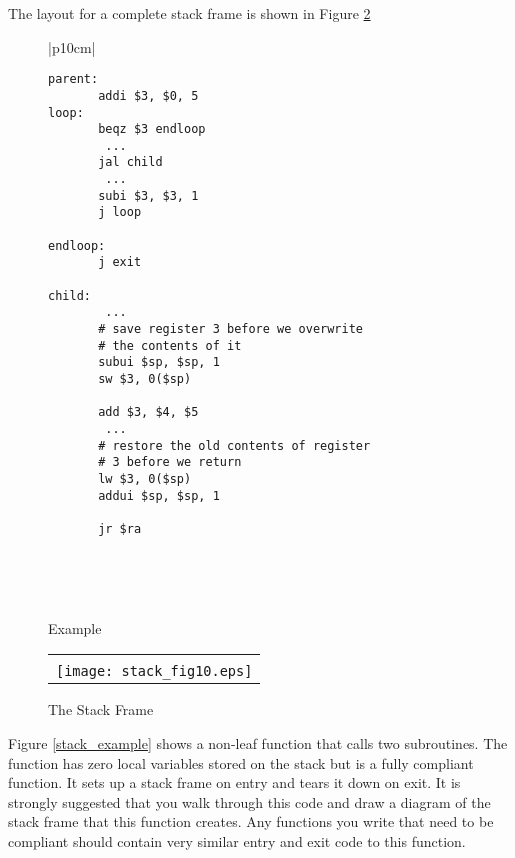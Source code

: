 The layout for a complete stack frame is shown in Figure \ref{stackframe}

%
%
\begin{figure}[!btp]

\begin{center}
\begin{tabular}{|p{10cm}|}
\hline
\begin{scriptsize}
\begin{verbatim}
parent:
       addi $3, $0, 5
loop:
       beqz $3 endloop
        ...
       jal child
        ...
       subi $3, $3, 1
       j loop

endloop:
       j exit

child:
        ...
       # save register 3 before we overwrite
       # the contents of it
       subui $sp, $sp, 1
       sw $3, 0($sp)

       add $3, $4, $5
        ...
       # restore the old contents of register
       # 3 before we return
       lw $3, 0($sp)
       addui $sp, $sp, 1

       jr $ra
\end{verbatim}
\end{scriptsize}
\\
\hline
\end{tabular}
\end{center}
\

\caption{Example}
\label{fig:paramexample}
\end{figure}


\begin{figure}[!hbtp]
\begin{footnotesize}
\begin{center}
\begin{tabular}{|p{8cm}|}
\hline
\\
\texttt{[image: stack\_fig10.eps]}

\\
\hline
\end{tabular}
\end{center}
\end{footnotesize}

\caption{The Stack Frame}
\label{stackframe}
\end{figure}

Figure \ref{stack_example} shows a non-leaf function that calls two
subroutines. The function has zero local variables stored on the
stack but is a fully compliant function. It sets up a stack frame on
entry and tears it down on exit. It is strongly suggested that you
walk through this code and draw a diagram of the stack frame that this
function creates. Any functions you write that need to be compliant
should contain very similar entry and exit code to this function.

